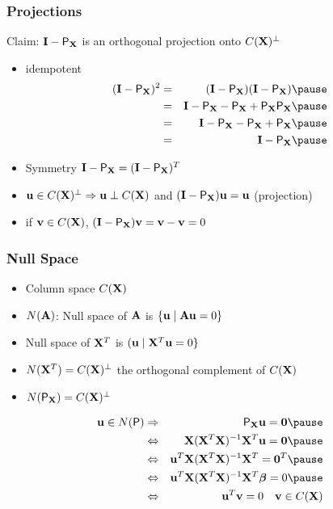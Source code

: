 \documentclass[handout]{beamer}
\begin{document}
\begin{frame} \frametitle{Projections}
  Claim: $\mathbf{I} - \textsf{P}_{\mathbf{X}}$ is an orthogonal projection onto $C(\mathbf{X})^{\perp}$ \pause
  \begin{itemize}
  \item idempotent  \pause
    \begin{eqnarray*}
(\I - \P_{\X})^2 &= & (\I - \P_\X)(\I - \P_\X)  \pause \\
& = & \I - \P_\X - \P_\X + \P_\X \P_\X       \pause \\
& = & \I - \P_\X -\P_\X + \P_\X  \pause\\
& = & \I - \P_\X  \pause
    \end{eqnarray*}
\item Symmetry $\mathbf{I} - \textsf{P}_{\mathbf{X}} = (\mathbf{I} - \textsf{P}_{\mathbf{X}})^T$  \pause
\item $\mathbf{u} \in C(\mathbf{X})^{\perp} \Rightarrow \mathbf{u} \perp C(\mathbf{X})$ and  $(\mathbf{I}
  -\textsf{P}_{\mathbf{X}}) \mathbf{u}  = \mathbf{u}$  (projection)  \pause
\item if $\mathbf{v} \in C(\mathbf{X})$, $(\mathbf{I} - \textsf{P}_{\mathbf{X}} ) \mathbf{v} = \mathbf{v} - \mathbf{v} = 0$ 
  \end{itemize}
\end{frame}

\begin{frame} \frametitle{Null Space}
  \begin{itemize}
  \item   Column space $C(\mathbf{X})$   \pause
  \item  $N(\mathbf{A})$: Null space of $\mathbf{A}$ is  $\{ \mathbf{u} \mid \mathbf{A} \mathbf{u} = 0 \}$   \pause
  \item  Null space of $\mathbf{X}^T$ is $(\mathbf{u} \mid \mathbf{X}^T \mathbf{u} = 0 \}$  \pause
  \item  $ N(\mathbf{X}^T) = C(\mathbf{X})^\perp$ the orthogonal complement of $C(\mathbf{X})$  \pause 
  \item $N(\textsf{P}_{\mathbf{X}}) = C(\mathbf{X})^\perp$   \pause
  \end{itemize}
  \begin{eqnarray*}
\u \in N(\P) & \Rightarrow & \P_\X \u = \zero   \pause\\
& \Leftrightarrow &    \X(\X^T\X)^{-1} \X^T \u = \zero  \pause  \\
& \Leftrightarrow & \u^T\X(\X^T\X)^{-1} \X^T   = \zero^T   \pause \\
& \Leftrightarrow & \u^T\X(\X^T\X)^{-1} \X^T\b   = 0   \pause \\
& \Leftrightarrow & \u^T\v   = 0  \quad
   \v \in C(\X)\\ 
  \end{eqnarray*}
\end{frame}
\end{document}
